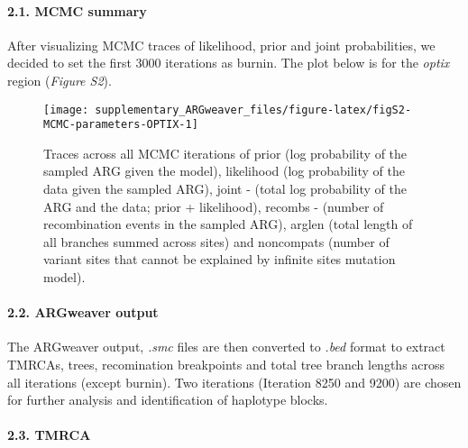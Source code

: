\documentclass[
]{article}
\begin{document}
\hypertarget{mcmc-summary}{%
\paragraph{\texorpdfstring{2.1. MCMC summary\\
}{2.1. MCMC summary }}\label{mcmc-summary}}

\hfill\break
After visualizing MCMC traces of likelihood, prior and joint
probabilities, we decided to set the first 3000 iterations as burnin.
The plot below is for the \emph{optix} region (\emph{Figure S2}).

\begin{figure}

{\centering \texttt{[image: supplementary\_ARGweaver\_files/figure-latex/figS2-MCMC-parameters-OPTIX-1]} 

}

\caption{Traces across all MCMC iterations of prior (log probability of the sampled ARG given the model), likelihood (log probability of the data given the sampled ARG), joint - (total log probability of the ARG and the data; prior + likelihood), recombs - (number of recombination events in the sampled ARG), arglen (total length of all branches summed across sites) and noncompats (number of variant sites that cannot be explained by infinite sites mutation model).}\label{fig:figS2-MCMC-parameters-OPTIX}
\end{figure}

\hypertarget{argweaver-output}{%
\paragraph{\texorpdfstring{2.2. ARGweaver output\\
}{2.2. ARGweaver output }}\label{argweaver-output}}

\hfill\break
The ARGweaver output, \emph{.smc} files are then converted to
\emph{.bed} format to extract TMRCAs, trees, recomination breakpoints
and total tree branch lengths across all iterations (except burnin). Two
iterations (Iteration 8250 and 9200) are chosen for further analysis and
identification of haplotype blocks.

\hypertarget{tmrca}{%
\paragraph{\texorpdfstring{2.3. TMRCA\\
}{2.3. TMRCA }}\label{tmrca}}
\end{document}
